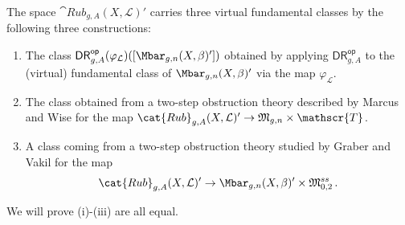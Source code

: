\documentclass[a4paper,12pt]{article} %
\newcommand{\bb}[1]{{\mathbb{#1}}}
\newcommand{\cl}[1]{{\mathscr{#1}}}
\newcommand{\ca}[1]{{\mathcal{#1}}}
\theoremstyle{definition}
\theoremstyle{plain}%
\newcommand{\MbarX}{\Mbar_{g,n}(X, \beta)}
\renewcommand{\phi}{\varphi}
\newcounter{nootje}
\newcommand\todo[1]{[*\thenootje]\marginpar{\tiny\begin{minipage}
{20mm}\begin{flushleft}\thenootje : 
#1\end{flushleft}\end{minipage}}\addtocounter{nootje}{1}}
\newcommand{\DRop}{\mathsf{DR}^{\mathsf{op}}}
\begin{document}
The space $\cat{Rub}_{g,A}(X, \ca L)'$ carries three virtual fundamental classes by
the following three constructions:
\begin{enumerate}
\item[(i)] The class $\DRop_{g,A}(\phi_\ca L)([\MbarX'])$ obtained by applying %
$\DRop_{g,A}$
to the (virtual) fundamental class of $\MbarX'$ via the map $\phi_\ca L$. 
\item[(ii)] The class obtained from a two-step obstruction theory described by Marcus and Wise \cite{Marcus2017Logarithmic-com} for the map $\cat{Rub}_{g,A}(X, \ca L)' \to \frak M_{g,n} \times \cl T$. 
\item[(iii)]  A class coming from a two-step obstruction theory studied by
Graber and Vakil \cite{Graber2005Relative-virtua} for the map 
$$\cat{Rub}_{g,A}(X, \ca L)' \to \MbarX' \times \frak M_{0,2}^{ss}\, .$$ 
\end{enumerate}
We will prove (i)-(iii) are all equal.




\end{document}
